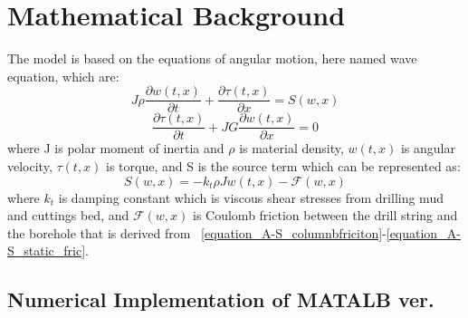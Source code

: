 \section{Mathematical Background}\label{SubSec_AS_mathematicalbackground}
The model is based on the equations of angular motion, here named wave equation, which are:
\begin{equation}\label{AS-motion}
  J\rho\frac{\partial w(t,x)}{\partial t} + \frac{\partial \tau (t,x)}{\partial x} = S(w,x) 
\end{equation}
\begin{equation}\label{AS-motion1}
 \frac{\partial\tau(t,x)}{\partial t} + JG\frac{\partial w(t,x)}{\partial x} = 0 
\end{equation}
where J is polar moment of inertia and $\rho$ is material density, $w(t,x)$ is angular velocity, $\tau(t,x)$ is torque, and S is the source term which can be represented as:
\begin{equation}\label{AS-sourceterm}
  S(w,x) = -k_t \rho J w(t,x) - \mathcal{F}(w,x)
\end{equation}
where $k_t$ is damping constant which is viscous shear stresses from drilling mud and cuttings bed, and $\mathcal{F}(w,x)$ is Coulomb friction between the drill string and the borehole that is derived from \equationname~\ref{equation_A-S_columnbfriciton}-\ref{equation_A-S_static_fric}.

\subsection{Numerical Implementation of MATALB ver.}
